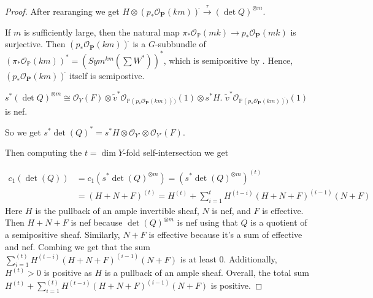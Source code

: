 \begin{proof}
After rearanging we get $H\otimes (p_*\mathcal{O}_{\mathbf{P}}(km))^{\check{}}\stackrel{\tau}\to (\det Q)^{\otimes m}$. 

If $m$ is sufficiently large, then the natural map $\pi_*\mathcal{O}_{\mathbb{P}}(mk)\to p_*\mathcal{O}_{\mathbf{P}}(mk) $ is surjective. Then $(p_*\mathcal{O}_{\mathbf{P}}(km))^{\check{}}$ is a $G$-subbundle  of $(\pi_*\mathcal{O}_{\mathbb{P}}(km))^*=(Sym^{km}(\sum W^*))^*$, which is semipositive by . Hence, $(p_*\mathcal{O}_{\mathbf{P}}(km))^{\check{}}$  itself is semipostive. 

$s^*(\det Q)^{\otimes m}\cong \mathcal{O}_Y(F)\otimes \tilde{v}^*\mathcal{O}_{\mathbb{P}(p_*\mathcal{O}_{\mathbf{P}}(km))^{\check{}})}(1)\otimes s^*H$.  $\tilde{v}^*\mathcal{O}_{\mathbb{P}(p_*\mathcal{O}_{\mathbf{P}}(km))^{\check{}})}(1)$ is nef. 
  
So we get   
$s^*\det(Q)^*=s^*H\otimes \mathcal{O}_{Y'}\otimes \mathcal{O}_{Y'}(F)$.   

Then computing the $t=\dim Y$-fold self-intersection we get 

\begin{align*}
c_1(\det(Q)) & =c_1(s^*\det(Q)^{\otimes m})=(s^*\det(Q)^{\otimes m})^{(t)}\\ & =(H+N+F)^{(t)}=H^{(t)}+\sum\limits_{i=1}^{t} H^{(t-i)}(H+N+F)^{(i-1)}(N+F)
\end{align*} 
 Here $H$ is the pullback of an ample invertible sheaf, $N$ is nef, and $F$ is effective. Then $H+N+F$ is nef because $\det(Q)^{\otimes m}$ is nef using that $Q$ is a quotient of a semipositive sheaf.  Similarly, $N+F$ is effective because it's a sum of effective and nef. Combing we get that the sum $\sum\limits_{i=1}^{(t)} H^{(t-i)}(H+N+F)^{(i-1)}(N+F)$ is at least 0. Additionally, $H^{(t)}>0$ is positive as $H$ is a pullback of an ample sheaf. Overall, the total sum $H^{(t)}+\sum\limits_{i=1}^{(t)} H^{(t-i)}(H+N+F)^{(i-1)}(N+F)$ is positive. 


  
\end{proof}





